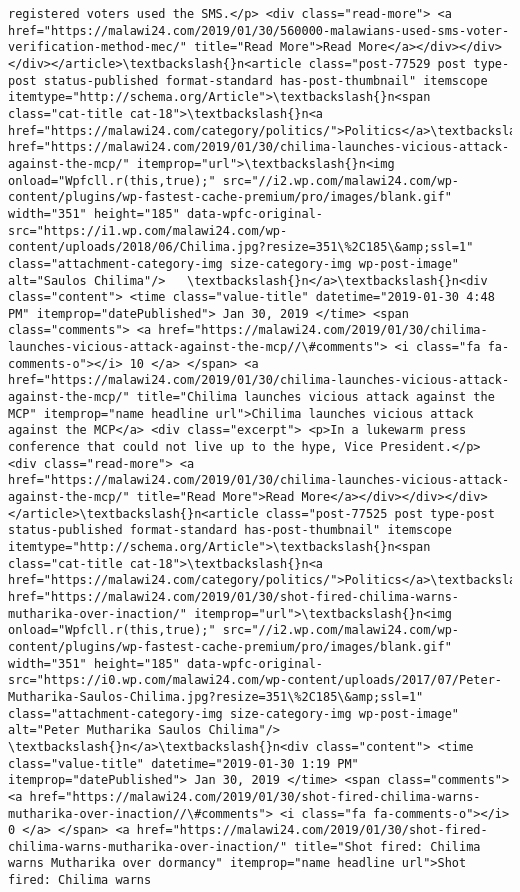 \documentclass[11pt]{article}
\begin{document}
\begin{Verbatim}[commandchars=\\\{\}]
registered voters used the SMS.</p> <div class="read-more"> <a href="https://malawi24.com/2019/01/30/560000-malawians-used-sms-voter-verification-method-mec/" title="Read More">Read More</a></div></div></div></article>\textbackslash{}n<article class="post-77529 post type-post status-published format-standard has-post-thumbnail" itemscope itemtype="http://schema.org/Article">\textbackslash{}n<span class="cat-title cat-18">\textbackslash{}n<a href="https://malawi24.com/category/politics/">Politics</a>\textbackslash{}n</span>\textbackslash{}n<a href="https://malawi24.com/2019/01/30/chilima-launches-vicious-attack-against-the-mcp/" itemprop="url">\textbackslash{}n<img onload="Wpfcll.r(this,true);" src="//i2.wp.com/malawi24.com/wp-content/plugins/wp-fastest-cache-premium/pro/images/blank.gif" width="351" height="185" data-wpfc-original-src="https://i1.wp.com/malawi24.com/wp-content/uploads/2018/06/Chilima.jpg?resize=351\%2C185\&amp;ssl=1" class="attachment-category-img size-category-img wp-post-image" alt="Saulos Chilima"/>   \textbackslash{}n</a>\textbackslash{}n<div class="content"> <time class="value-title" datetime="2019-01-30 4:48 PM" itemprop="datePublished"> Jan 30, 2019 </time> <span class="comments"> <a href="https://malawi24.com/2019/01/30/chilima-launches-vicious-attack-against-the-mcp//\#comments"> <i class="fa fa-comments-o"></i> 10 </a> </span> <a href="https://malawi24.com/2019/01/30/chilima-launches-vicious-attack-against-the-mcp/" title="Chilima launches vicious attack against the MCP" itemprop="name headline url">Chilima launches vicious attack against the MCP</a> <div class="excerpt"> <p>In a lukewarm press conference that could not live up to the hype, Vice President.</p> <div class="read-more"> <a href="https://malawi24.com/2019/01/30/chilima-launches-vicious-attack-against-the-mcp/" title="Read More">Read More</a></div></div></div></article>\textbackslash{}n<article class="post-77525 post type-post status-published format-standard has-post-thumbnail" itemscope itemtype="http://schema.org/Article">\textbackslash{}n<span class="cat-title cat-18">\textbackslash{}n<a href="https://malawi24.com/category/politics/">Politics</a>\textbackslash{}n</span>\textbackslash{}n<a href="https://malawi24.com/2019/01/30/shot-fired-chilima-warns-mutharika-over-inaction/" itemprop="url">\textbackslash{}n<img onload="Wpfcll.r(this,true);" src="//i2.wp.com/malawi24.com/wp-content/plugins/wp-fastest-cache-premium/pro/images/blank.gif" width="351" height="185" data-wpfc-original-src="https://i0.wp.com/malawi24.com/wp-content/uploads/2017/07/Peter-Mutharika-Saulos-Chilima.jpg?resize=351\%2C185\&amp;ssl=1" class="attachment-category-img size-category-img wp-post-image" alt="Peter Mutharika Saulos Chilima"/>   \textbackslash{}n</a>\textbackslash{}n<div class="content"> <time class="value-title" datetime="2019-01-30 1:19 PM" itemprop="datePublished"> Jan 30, 2019 </time> <span class="comments"> <a href="https://malawi24.com/2019/01/30/shot-fired-chilima-warns-mutharika-over-inaction//\#comments"> <i class="fa fa-comments-o"></i> 0 </a> </span> <a href="https://malawi24.com/2019/01/30/shot-fired-chilima-warns-mutharika-over-inaction/" title="Shot fired: Chilima warns Mutharika over dormancy" itemprop="name headline url">Shot fired: Chilima warns 
\end{Verbatim}
\end{document}
